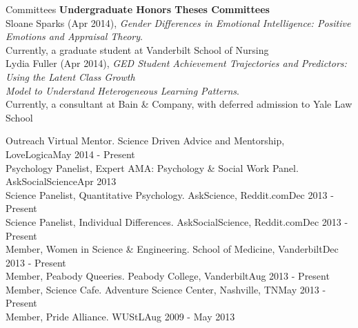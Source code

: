 \documentclass {resume}
\begin{document}
\newpage 
\begin{rSection}{\textrm{Committees}}
{\large \textbf{Undergraduate Honors Theses Committees}}\\
Sloane Sparks (Apr 2014), \textit{Gender Differences in Emotional Intelligence: Positive Emotions and Appraisal Theory}.\\
\hspace* {6 mm}Currently, a graduate student at Vanderbilt School of Nursing\smallskip\\%
Lydia Fuller (Apr 2014), \textit{GED Student Achievement Trajectories and Predictors: Using the Latent Class Growth\\
\hspace* {6 mm}Model to Understand Heterogeneous Learning Patterns}.\\
\hspace* {6 mm}Currently, a consultant at Bain \& Company, with deferred admission to Yale Law School
\end{rSection}%
\begin{rSection}{\textrm{Outreach}}
Virtual Mentor. Science Driven Advice and Mentorship, LoveLogica\hfill  {May 2014 - Present}\smallskip\\
Psychology Panelist, Expert AMA: Psychology \& Social Work Panel. AskSocialScience\hfill  {Apr 2013}\smallskip\\
Science Panelist, Quantitative Psychology. AskScience, Reddit.com\hfill  {Dec 2013 - Present}\smallskip\\%
Science Panelist, Individual Differences. AskSocialScience, Reddit.com\hfill  {Dec 2013 - Present}\smallskip\\
Member, Women in Science \& Engineering. School of Medicine, Vanderbilt\hfill  {Dec 2013 - Present}\smallskip\\%
Member, Peabody Queeries. Peabody College, Vanderbilt\hfill  {Aug 2013 - Present}\smallskip\\
Member, Science Cafe. Adventure Science Center, Nashville, TN\hfill  {May 2013 - Present}\smallskip\\
Member, Pride Alliance. WUStL\hfill  {Aug 2009 - May 2013}
\end{rSection}
\end{document}
